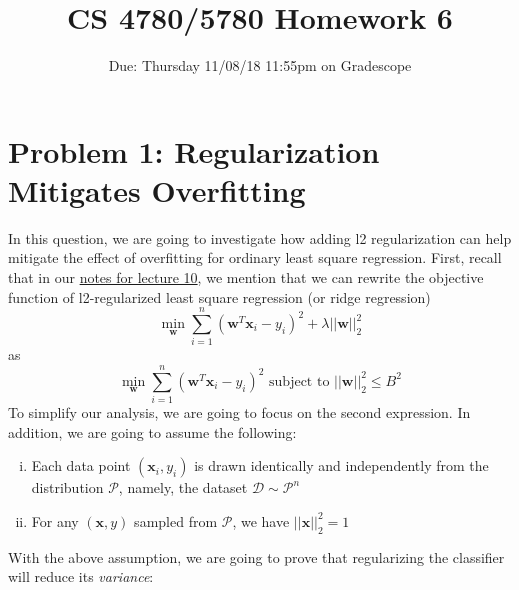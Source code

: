 \documentclass{article}
\title{CS 4780/5780 Homework 6\vspace{-10pt}}
\author{Due: Thursday 11/08/18 11:55pm on Gradescope}
\date{}
\begin{document}
    \maketitle
    \section*{Problem 1: Regularization Mitigates Overfitting}
    In this question, we are going to investigate how adding l2 regularization 
    can help mitigate the effect of overfitting for ordinary least square regression. 
    First, recall that in our \href{http://www.cs.cornell.edu/courses/cs4780/2018sp/lectures/lecturenote10.html}{notes for lecture 10}, we mention that we can rewrite the objective 
    function of l2-regularized least square regression (or ridge regression)
    $$\min_{\mathbf{w}} \sum_{i=1}^n (\mathbf{w}^T \mathbf{x}_i - y_i) ^ 2 + \lambda {||\mathbf{w}||}_2^2$$ as 
    $$\min_{\mathbf{w}} \sum_{i=1}^n (\mathbf{w}^T \mathbf{x}_i - y_i) ^ 2  \text{ subject to } {||\mathbf{w}||}_2^2 \leq B^2$$
    To simplify our analysis, we are going to focus on the second expression. 
    In addition, we are going to assume the following:
    \begin{enumerate}[(i)]
        \item Each data point $(\mathbf{x}_i, y_i)$ is drawn identically and independently from the distribution $\mathcal{P}$, namely, the dataset $\mathcal{D} \sim \mathcal{P}^n$ 
        \item For any $(\mathbf{x},y)$ sampled from $\mathcal{P}$, we have $||\mathbf{x}||_2^2 =  1$ 
    \end{enumerate}
    With the above assumption, we are going to prove that regularizing the classifier will reduce its \emph{variance}: 
\end{document}
